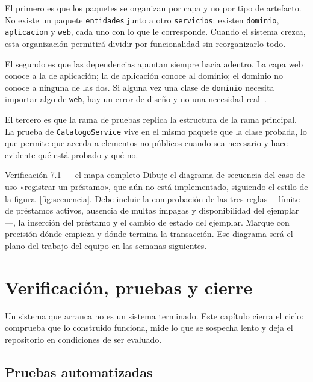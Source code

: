 \documentclass[11pt,a4paper,openany]{book}
\begin{document}
El primero es que los paquetes se organizan por capa y no por tipo de artefacto. No existe un paquete \texttt{entidades} junto a otro \texttt{servicios}: existen \texttt{dominio}, \texttt{aplicacion} y \texttt{web}, cada uno con lo que le corresponde. Cuando el sistema crezca, esta organización permitirá dividir por funcionalidad sin reorganizarlo todo.

El segundo es que las dependencias apuntan siempre hacia adentro. La capa web conoce a la de aplicación; la de aplicación conoce al dominio; el dominio no conoce a ninguna de las dos. Si alguna vez una clase de \texttt{dominio} necesita importar algo de \texttt{web}, hay un error de diseño y no una necesidad real~\cite{martin2017clean}.

El tercero es que la rama de pruebas replica la estructura de la rama principal. La prueba de \texttt{CatalogoService} vive en el mismo paquete que la clase probada, lo que permite que acceda a elementos no públicos cuando sea necesario y hace evidente qué está probado y qué no.

\begin{cajaejercicio}{Verificación 7.1 --- el mapa completo}
	Dibuje el diagrama de secuencia del caso de uso «registrar un préstamo», que aún no está implementado, siguiendo el estilo de la figura~\ref{fig:secuencia}. Debe incluir la comprobación de las tres reglas ---límite de préstamos activos, ausencia de multas impagas y disponibilidad del ejemplar---, la inserción del préstamo y el cambio de estado del ejemplar. Marque con precisión dónde empieza y dónde termina la transacción. Ese diagrama será el plano del trabajo del equipo en las semanas siguientes.
\end{cajaejercicio}

\chapter{Verificación, pruebas y cierre}
\label{cap:verificacion}

Un sistema que arranca no es un sistema terminado. Este capítulo cierra el ciclo: comprueba que lo construido funciona, mide lo que se sospecha lento y deja el repositorio en condiciones de ser evaluado.

\section{Pruebas automatizadas}
\label{sec:pruebas}
\end{document}
